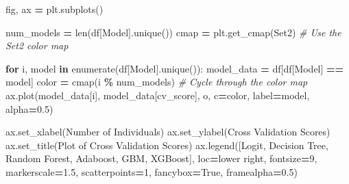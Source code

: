 \documentclass[
]{book}
\newenvironment{Shaded}{\begin{snugshade}}{\end{snugshade}}
\newcommand{\BuiltInTok}[1]{#1}
\newcommand{\CommentTok}[1]{\textcolor[rgb]{0.56,0.35,0.01}{\textit{#1}}}
\newcommand{\ControlFlowTok}[1]{\textcolor[rgb]{0.13,0.29,0.53}{\textbf{#1}}}
\newcommand{\DecValTok}[1]{\textcolor[rgb]{0.00,0.00,0.81}{#1}}
\newcommand{\FloatTok}[1]{\textcolor[rgb]{0.00,0.00,0.81}{#1}}
\newcommand{\KeywordTok}[1]{\textcolor[rgb]{0.13,0.29,0.53}{\textbf{#1}}}
\newcommand{\NormalTok}[1]{#1}
\newcommand{\OperatorTok}[1]{\textcolor[rgb]{0.81,0.36,0.00}{\textbf{#1}}}
\newcommand{\StringTok}[1]{\textcolor[rgb]{0.31,0.60,0.02}{#1}}
\newcommand{\VariableTok}[1]{\textcolor[rgb]{0.00,0.00,0.00}{#1}}
\theoremstyle{definition}
\theoremstyle{definition}
\theoremstyle{definition}
\theoremstyle{definition}
\theoremstyle{remark}
\begin{document}
\begin{Shaded}
\begin{Highlighting}[]
\NormalTok{    fig, ax }\OperatorTok{=}\NormalTok{ plt.subplots()}

\NormalTok{    num\_models }\OperatorTok{=} \BuiltInTok{len}\NormalTok{(df[}\StringTok{\textquotesingle{}Model\textquotesingle{}}\NormalTok{].unique())}
\NormalTok{    cmap }\OperatorTok{=}\NormalTok{ plt.get\_cmap(}\StringTok{\textquotesingle{}Set2\textquotesingle{}}\NormalTok{)  }\CommentTok{\# Use the Set2 color map}

    \ControlFlowTok{for}\NormalTok{ i, model }\KeywordTok{in} \BuiltInTok{enumerate}\NormalTok{(df[}\StringTok{\textquotesingle{}Model\textquotesingle{}}\NormalTok{].unique()):}
\NormalTok{        model\_data }\OperatorTok{=}\NormalTok{ df[df[}\StringTok{\textquotesingle{}Model\textquotesingle{}}\NormalTok{] }\OperatorTok{==}\NormalTok{ model]}
\NormalTok{        color }\OperatorTok{=}\NormalTok{ cmap(i }\OperatorTok{\%}\NormalTok{ num\_models)  }\CommentTok{\# Cycle through the color map}
\NormalTok{        ax.plot(model\_data[}\StringTok{\textquotesingle{}i\textquotesingle{}}\NormalTok{], model\_data[}\StringTok{\textquotesingle{}cv\_score\textquotesingle{}}\NormalTok{], }\StringTok{\textquotesingle{}{-}o\textquotesingle{}}\NormalTok{, c}\OperatorTok{=}\NormalTok{color, label}\OperatorTok{=}\NormalTok{model, alpha}\OperatorTok{=}\FloatTok{0.5}\NormalTok{)}

\NormalTok{    ax.set\_xlabel(}\StringTok{\textquotesingle{}Number of Individuals\textquotesingle{}}\NormalTok{)}
\NormalTok{    ax.set\_ylabel(}\StringTok{\textquotesingle{}Cross Validation Scores\textquotesingle{}}\NormalTok{)}
\NormalTok{    ax.set\_title(}\StringTok{\textquotesingle{}Plot of Cross Validation Scores\textquotesingle{}}\NormalTok{)}
\NormalTok{    ax.legend([}\StringTok{\textquotesingle{}Logit\textquotesingle{}}\NormalTok{, }\StringTok{\textquotesingle{}Decision Tree\textquotesingle{}}\NormalTok{, }\StringTok{\textquotesingle{}Random Forest\textquotesingle{}}\NormalTok{, }\StringTok{\textquotesingle{}Adaboost\textquotesingle{}}\NormalTok{, }\StringTok{\textquotesingle{}GBM\textquotesingle{}}\NormalTok{, }\StringTok{\textquotesingle{}XGBoost\textquotesingle{}}\NormalTok{],}
\NormalTok{              loc}\OperatorTok{=}\StringTok{\textquotesingle{}lower right\textquotesingle{}}\NormalTok{,}
\NormalTok{              fontsize}\OperatorTok{=}\DecValTok{9}\NormalTok{, markerscale}\OperatorTok{=}\FloatTok{1.5}\NormalTok{, scatterpoints}\OperatorTok{=}\DecValTok{1}\NormalTok{,}
\NormalTok{              fancybox}\OperatorTok{=}\VariableTok{True}\NormalTok{, framealpha}\OperatorTok{=}\FloatTok{0.5}\NormalTok{)}
\end{Highlighting}
\end{Shaded}
\end{document}
